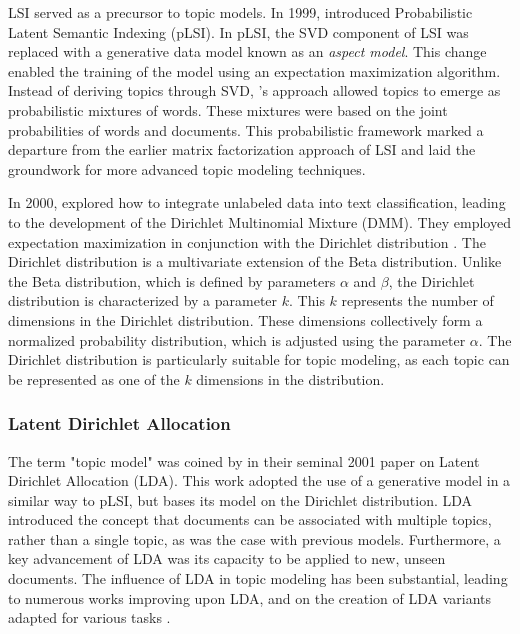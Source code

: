 \documentclass{article}
\begin{document}
LSI served as a precursor to topic models. In 1999, \citet{hofmann_probabilistic_1999} introduced Probabilistic Latent Semantic Indexing (pLSI). In pLSI, the SVD component of LSI was replaced with a generative data model known as an \textit{aspect model}. This change enabled the training of the model using an expectation maximization algorithm. Instead of deriving topics through SVD, \citeauthor{hofmann_probabilistic_1999}'s approach allowed topics to emerge as probabilistic mixtures of words. These mixtures were based on the joint probabilities of words and documents. This probabilistic framework marked a departure from the earlier matrix factorization approach of LSI and laid the groundwork for more advanced topic modeling techniques.

In 2000, \citet{nigam_text_2000} explored how to integrate unlabeled data into text classification, leading to the development of the Dirichlet Multinomial Mixture (DMM). They employed expectation maximization in conjunction with the Dirichlet distribution \cite{de_theorie_1814}. The Dirichlet distribution is a multivariate extension of the Beta distribution. Unlike the Beta distribution, which is defined by parameters $\alpha$ and $\beta$, the Dirichlet distribution is characterized by a parameter $k$. This $k$ represents the number of dimensions in the Dirichlet distribution. These dimensions collectively form a normalized probability distribution, which is adjusted using the parameter $\alpha$. The Dirichlet distribution is particularly suitable for topic modeling, as each topic can be represented as one of the $k$ dimensions in the distribution.

\subsubsection{Latent Dirichlet Allocation}
The term "topic model" was coined by \citet{blei_latent_2001} in their seminal 2001 paper on Latent Dirichlet Allocation (LDA). This work adopted the use of a generative model in a similar way to pLSI, but bases its model on the Dirichlet distribution. LDA introduced the concept that documents can be associated with multiple topics, rather than a single topic, as was the case with previous models. Furthermore, a key advancement of LDA was its capacity to be applied to new, unseen documents. The influence of LDA in topic modeling has been substantial, leading to numerous works improving upon LDA, and on the creation of LDA variants adapted for various tasks \cite{jelodar_latent_2019, teh_sharing_2004, lafferty_correlated_2005, blei_dynamic_2006, chemudugunta_modeling_2006, nallapati_multiscale_2007, wang_continuous_2012, iwata_topic_2009, banerjee_topic_2007, porteous_fast_2008, yao_efficient_2009, hoffman_online_2010}.
\end{document}

